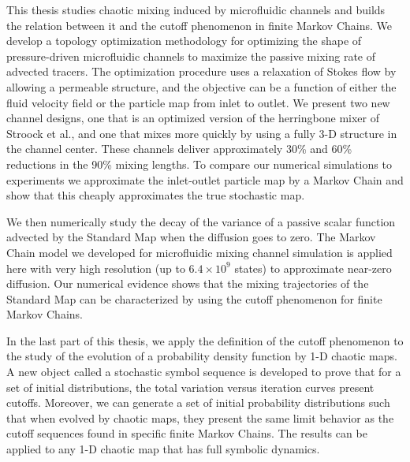 %
%
This thesis studies chaotic mixing induced by microfluidic channels and builds the relation between it and the cutoff phenomenon in finite Markov Chains. We develop a topology optimization methodology for optimizing the shape of pressure-driven microfluidic channels to maximize the passive mixing rate of advected tracers. The optimization procedure uses a relaxation of Stokes flow by allowing a permeable structure, and the objective can be a function of either the fluid velocity field or the particle map from inlet to outlet. We present two new channel
designs, one that is an optimized version of the herringbone mixer of Stroock et al., and one that mixes more quickly by using a fully 3-D structure in the channel center. These channels deliver approximately 30\% and 60\% reductions in the 90\% mixing lengths. To compare our numerical simulations to experiments we approximate the inlet-outlet particle map by a Markov Chain and show that this cheaply approximates the true stochastic map.

We then numerically study the decay of the variance of a passive scalar function advected by the Standard Map when the diffusion goes to zero. The Markov Chain model we developed for microfluidic mixing channel simulation is applied here with very high resolution (up to $6.4 \times 10^9$ states) to approximate near-zero diffusion. Our numerical evidence shows that the mixing trajectories of the Standard Map can be characterized by using the cutoff phenomenon for finite Markov Chains.

In the last part of this thesis, we apply the definition of the cutoff phenomenon to the study of the evolution of a probability density function by 1-D chaotic maps. A new object called a stochastic symbol sequence is developed to prove that for a set of initial distributions, the total variation versus iteration curves present cutoffs. Moreover, we can generate a set of initial probability distributions such that when evolved by chaotic maps, they present the same limit behavior as the cutoff sequences found in specific finite Markov Chains. The results can be applied to any 1-D chaotic map that has full symbolic dynamics.
